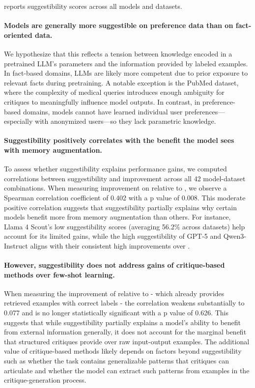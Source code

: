  reports suggestibility scores across all models and datasets.


\paragraph{Models are generally more suggestible on preference data than on fact-oriented data.} We hypothesize that this reflects a tension between knowledge encoded in a pretrained LLM’s parameters and the information provided by labeled examples. In fact-based domains, LLMs are likely more competent due to prior exposure to relevant facts during pretraining. A notable exception is the PubMed dataset, where the complexity of medical queries introduces enough ambiguity for critiques to meaningfully influence model outputs. In contrast, in preference-based domains, models cannot have learned individual user preferences—especially with anonymized users—so they lack parametric knowledge.

\paragraph{Suggestibility positively correlates with the benefit the model sees with memory augmentation.}
To assess whether suggestibility explains performance gains, we computed correlations between suggestibility and improvement across all 42 model-dataset combinations. When measuring improvement on \EPSEMCRIT{} relative to \ZEROSHOT{}, we observe a Spearman correlation coefficient of 0.402 with a p value of 0.008. This moderate positive correlation suggests that suggestibility partially explains why certain models benefit more from memory augmentation than others. For instance, Llama 4 Scout's low suggestibility scores (averaging 56.2\% across datasets) help account for its limited gains, while the high suggestibility of GPT-5 and Qwen3-Instruct aligns with their consistent high improvements over \ZEROSHOT{}.

\paragraph{However, suggestibility does not address gains of critique-based methods over few-shot learning.}
When measuring the improvement of \EPSEMCRIT{} relative to \EPLABEL{} - which already provides retrieved examples with correct labels - the correlation weakens substantially to 0.077 and is no longer statistically significant with a p value of 0.626. This suggests that while suggestibility partially explains a model's ability to benefit from external information generally, it does not account for the marginal benefit that structured critiques provide over raw input-output examples. The additional value of critique-based methods likely depends on factors beyond suggestibility such as whether the task contains generalizable patterns that critiques can articulate and whether the model can extract such patterns from examples in the critique-generation process.

